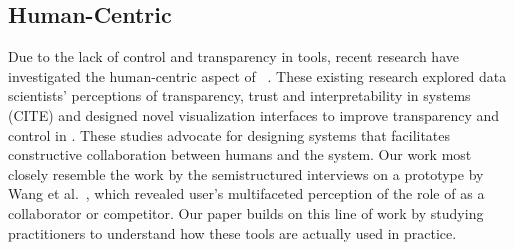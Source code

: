 


\subsection{Human-Centric \automl}
Due to the lack of control and transparency in \automl tools, recent research have investigated the human-centric aspect of \automl~\cite{Lee2019AHP,wang2018atmseer, gilHGML}. These existing research explored data scientists' perceptions of transparency, trust and interpretability in \automl systems (CITE) and designed novel visualization  interfaces to improve transparency and control in \automl\cite{wang2018atmseer, snowcat,WangIUI2020}. These studies advocate for designing systems that facilitates constructive collaboration between humans and the \automl system. Our work most closely resemble the work by the semistructured interviews on a \automl prototype by Wang et al.~\cite{DakuoCSCW2019}, which revealed user's multifaceted perception of the role of \automl as a collaborator or competitor. Our paper builds on this line of work by studying \automl practitioners to understand how these tools are actually used in practice.

